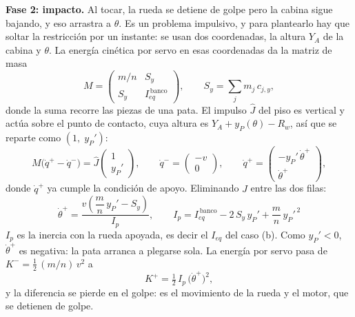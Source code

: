 \documentclass[11pt,a4paper]{article}
\begin{document}
\textbf{Fase 2: impacto.} Al tocar, la rueda se detiene de golpe pero la cabina sigue bajando, y eso arrastra
a \(\theta\). Es un problema impulsivo, y para plantearlo hay que soltar la restricción por un instante: se
usan dos coordenadas, la altura \(Y_A\) de la cabina y \(\theta\). La energía cinética por servo en esas
coordenadas da la matriz de masa
\begin{equation}
M=\begin{pmatrix} m/n & S_y \\ S_y & I_{eq}^{\,\text{banco}}\end{pmatrix},
\qquad S_y=\sum_j m_j\,c_{j,y},
\label{eq:Mimpacto}
\end{equation}
donde la suma recorre las piezas de una pata. El impulso \(\hat J\) del piso es vertical y actúa sobre el
punto de contacto, cuya altura es \(Y_A+y_P(\theta)-R_w\), así que se reparte como \((1,\;y_P')\):
\begin{equation}
M\bigl(\dot q^{+}-\dot q^{-}\bigr)=\hat J\begin{pmatrix}1\\ y_P'\end{pmatrix},
\qquad \dot q^{-}=\begin{pmatrix}-v\\ 0\end{pmatrix},
\qquad \dot q^{+}=\begin{pmatrix}-y_P'\,\dot\theta^{+}\\ \dot\theta^{+}\end{pmatrix},
\label{eq:impulso}
\end{equation}
donde \(\dot q^{+}\) ya cumple la condición de apoyo. Eliminando \(\hat J\) entre las dos filas:
\begin{equation}
\boxed{\;
\dot\theta^{+}=\frac{v\left(\dfrac{m}{n}\,y_P'-S_y\right)}{I_p},
\qquad I_p=I_{eq}^{\,\text{banco}}-2\,S_y\,y_P'+\frac{m}{n}\,y_P'^{\,2}
\;}
\label{eq:dthimp}
\end{equation}
\(I_p\) es la inercia con la rueda apoyada, es decir el \(I_{eq}\) del caso (b). Como \(y_P'<0\),
\(\dot\theta^{+}\) es negativa: la pata arranca a plegarse sola. La energía por servo pasa de
\(K^{-}=\tfrac12\,(m/n)\,v^2\) a
\begin{equation}
K^{+}=\tfrac12\,I_p\,\bigl(\dot\theta^{+}\bigr)^2,
\label{eq:Kimp}
\end{equation}
y la diferencia se pierde en el golpe: es el movimiento de la rueda y el motor, que se detienen de golpe.
\end{document}
